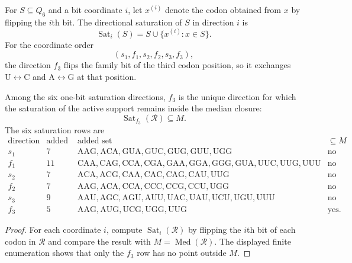 \begin{definition}
\label{def:philosophy-directional-saturation}
For $S\subseteq Q_{6}$ and a bit coordinate $i$, let $x^{(i)}$ denote
the codon obtained from $x$ by flipping the $i$th bit. The directional
saturation of $S$ in direction $i$ is
$$
  \operatorname{Sat}_{i}(S)
  =
  S\cup\{x^{(i)}:x\in S\}.
$$
For the coordinate order
$$
  (s_{1},f_{1},s_{2},f_{2},s_{3},f_{3}),
$$
the direction $f_{3}$ flips the family bit of the third codon position,
so it exchanges $\mathrm{U}\leftrightarrow\mathrm{C}$ and
$\mathrm{A}\leftrightarrow\mathrm{G}$ at that position.
\end{definition}

\begin{theorem}
\label{thm:philosophy-unique-nonleaking-saturation-direction}
Among the six one-bit saturation directions, $f_{3}$ is the unique
direction for which the saturation of the active support remains inside
the median closure:
$$
  \operatorname{Sat}_{f_{3}}(\mathcal{R})\subseteq M.
$$
The six saturation rows are
$$
\begin{array}{c|r|l|c}
  \text{direction} & \text{added codons} & \text{added set}
  & \subseteq M\\
  \hline
  s_{1} & 7 &
  \mathrm{AAG},\mathrm{ACA},\mathrm{GUA},\mathrm{GUC},
  \mathrm{GUG},\mathrm{GUU},\mathrm{UGG} & \text{no}\\
  f_{1} & 11 &
  \mathrm{CAA},\mathrm{CAG},\mathrm{CCA},\mathrm{CGA},
  \mathrm{GAA},\mathrm{GGA},\mathrm{GGG},\mathrm{GUA},
  \mathrm{UUC},\mathrm{UUG},\mathrm{UUU} & \text{no}\\
  s_{2} & 7 &
  \mathrm{ACA},\mathrm{ACG},\mathrm{CAA},\mathrm{CAC},
  \mathrm{CAG},\mathrm{CAU},\mathrm{UUG} & \text{no}\\
  f_{2} & 7 &
  \mathrm{AAG},\mathrm{ACA},\mathrm{CCA},\mathrm{CCC},
  \mathrm{CCG},\mathrm{CCU},\mathrm{UGG} & \text{no}\\
  s_{3} & 9 &
  \mathrm{AAU},\mathrm{AGC},\mathrm{AGU},\mathrm{AUU},
  \mathrm{UAC},\mathrm{UAU},\mathrm{UCU},\mathrm{UGU},
  \mathrm{UUU} & \text{no}\\
  f_{3} & 5 &
  \mathrm{AAG},\mathrm{AUG},\mathrm{UCG},\mathrm{UGG},
  \mathrm{UUG} & \text{yes}.
\end{array}
$$
\end{theorem}
\begin{proof}
For each coordinate $i$, compute
$\operatorname{Sat}_{i}(\mathcal{R})$ by flipping the $i$th bit of each
codon in $\mathcal{R}$ and compare the result with
$M=\operatorname{Med}(\mathcal{R})$. The displayed finite enumeration
shows that only the $f_{3}$ row has no point outside $M$.
\end{proof}

